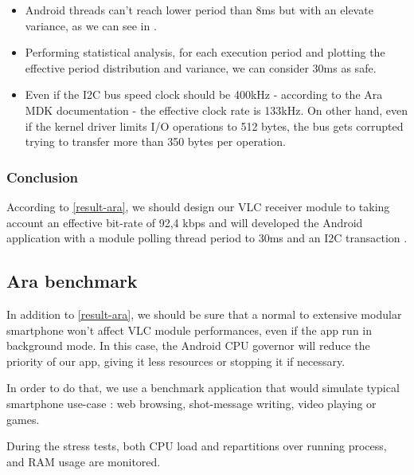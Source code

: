 \begin{itemize}
\item Android threads can't reach lower period than 8ms but with an elevate variance, as we can see in .

\item Performing statistical analysis, for each execution period and plotting the effective period distribution and variance, we can consider 30ms as safe.

\item Even if the I2C bus speed clock should be 400kHz - according to the Ara MDK documentation - the effective clock rate is 133kHz.
On other hand, even if the kernel driver limits I/O operations to 512 bytes, the bus gets corrupted trying to transfer more than 350 bytes per operation.
\end{itemize}

\subsubsection{Conclusion}  \label{conclusion-ara}
According to \ref{result-ara}, we should design our VLC receiver module to taking account an effective bit-rate of 92,4 kbps and will developed the Android application with a module polling thread period to 30ms and an I2C transaction . 


\subsection{Ara benchmark}

In addition to \ref{result-ara}, we should be sure that a normal to extensive modular smartphone won't affect VLC module performances, even if the app run in background mode. In this case, the Android CPU governor will reduce the priority of our app, giving it less resources or stopping it if necessary.

In order to do that, we use a benchmark application that would simulate typical smartphone use-case : web browsing, shot-message writing, video playing or games.

During the stress tests, both CPU load and repartitions over running process, and RAM usage are monitored.

